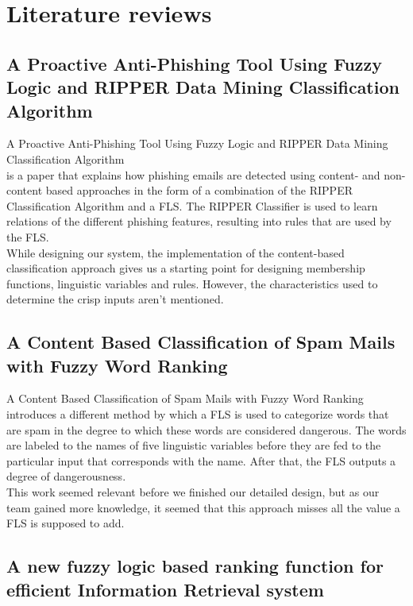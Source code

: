 \documentclass[journal]{IEEEtran}
\begin{document}
\section{Literature reviews}

\subsection{A Proactive Anti-Phishing Tool Using Fuzzy Logic and RIPPER Data Mining Classification Algorithm}

A Proactive Anti-Phishing Tool Using Fuzzy Logic and RIPPER Data Mining Classification Algorithm \cite{phishing} \\ is a paper that explains how phishing emails are detected using content- and non-content based approaches in the form of a combination of the RIPPER Classification Algorithm and a FLS. The RIPPER Classifier is used to learn relations of the different phishing features, resulting into rules that are used by the FLS. \\

While designing our system, the implementation of the content-based classification approach gives us a starting point for designing membership functions, linguistic variables and rules. However, the characteristics used to determine the crisp inputs aren't mentioned.

\subsection{A Content Based Classification of Spam Mails with Fuzzy Word Ranking}

A Content Based Classification of Spam Mails with Fuzzy Word Ranking
\cite{spam} introduces a different method by which a FLS is used to categorize words that are spam in the degree to which these words are considered dangerous. The words are labeled to the names of five linguistic variables before they are fed to the particular input that corresponds with the name. After that, the FLS outputs a degree of dangerousness. \\

This work seemed relevant before we finished our detailed design, but as our team gained more knowledge, it seemed that this approach misses all the value a FLS is supposed to add.

\subsection{A new fuzzy logic based ranking function for efficient Information Retrieval system}
\end{document}
